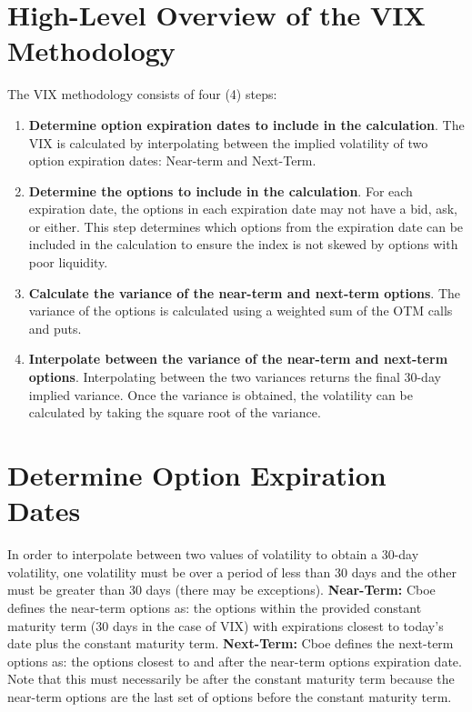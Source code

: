 \documentclass[11pt, oneside]{book}
\begin{document}
\section{High-Level Overview of the VIX Methodology} \label{CalcVix-HighLevel}
The VIX methodology consists of four (4) steps:

\begin{enumerate}
    \item \textbf{Determine option expiration dates to include in the calculation}. The VIX is calculated by interpolating between the implied volatility of two option expiration dates: Near-term and Next-Term. 
    \item \textbf{Determine the options to include in the calculation}. For each expiration date, the options in each expiration date may not have a bid, ask, or either. This step determines which options from the expiration date can be included in the calculation to ensure the index is not skewed by options with poor liquidity.
    \item \textbf{Calculate the variance of the near-term and next-term options}. The variance of the options is calculated using a weighted sum of the OTM calls and puts. 
    \item \textbf{Interpolate between the variance of the near-term and next-term options}. Interpolating between the two variances returns the final 30-day implied variance. Once the variance is obtained, the volatility can be calculated by taking the square root of the variance.
\end{enumerate}

\section{Determine Option Expiration Dates} \label{CalcVix-DetermineDates}
In order to interpolate between two values of volatility to obtain a 30-day volatility, one volatility must be over a period of less than 30 days and the other must be greater than 30 days (there may be exceptions).
\textbf{Near-Term:} Cboe defines the near-term options as: the options within the provided constant maturity term (30 days in the case of VIX) with expirations closest to today's date plus the constant maturity term.
\textbf{Next-Term:} Cboe defines the next-term options as: the options closest to and after the near-term options expiration date. Note that this must necessarily be after the constant maturity term because the near-term options are the last set of options before the constant maturity term.
\end{document}
